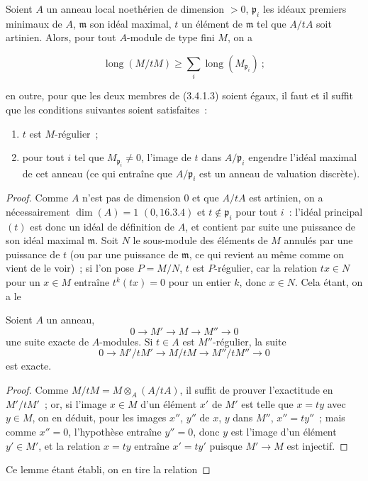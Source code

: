 \begin{lemma}[3.4.1.2]
\label{IV.2.3.4.1.2-fr}
Soient $A$ un anneau local noethérien de dimension $>0$, $\mathfrak p_i$ les
idéaux premiers minimaux de $A$, $\mathfrak m$ son idéal maximal, $t$ un
élément de $\mathfrak m$ tel que $A/tA$ soit artinien. Alors, pour tout
$A$-module de type fini $M$, on a
\end{lemma}

\begin{env}[3.4.1.3]
\label{IV.2.3.4.1.3-fr}
\[
\operatorname{long}(M/tM)
\geqslant\sum_i\operatorname{long}(M_{\mathfrak p_i})~;
\]
\end{env}

en outre, pour que les deux membres de (3.4.1.3) soient égaux, il faut et il
suffit que les conditions suivantes soient satisfaites~:


\begin{enumerate}
\item[$\alpha$)] $t$ est $M$-régulier~;
\item[$\beta$)] pour tout $i$ tel que $M_{\mathfrak p_i}\neq0$, l'image de $t$
dans $A/\mathfrak p_i$ engendre l'idéal maximal de cet anneau (ce qui entraîne
que $A/\mathfrak p_i$ est un anneau de valuation discrète).
\end{enumerate}

\begin{proof}
Comme $A$ n'est pas de dimension $0$ et que $A/tA$ est artinien, on a
nécessairement $\dim(A)=1$ $(0,16.3.4)$ et $t\notin\mathfrak p_i$ pour tout
$i$~: l'idéal principal $(t)$ est donc un idéal de définition de $A$, et
contient par suite une puissance de son idéal maximal $\mathfrak m$. Soit $N$
le sous-module des éléments de $M$ annulés par une puissance de $t$ (ou par
une puissance de $\mathfrak m$, ce qui revient au même comme on vient de le
voir)~; si l'on pose $P=M/N$, $t$ est $P$-régulier, car la relation $tx\in N$
pour un $x\in M$ entraîne $t^k(tx)=0$ pour un entier $k$, donc $x\in N$. Cela
étant, on a le

\begin{lemma}[3.4.1.4]
\label{IV.2.3.4.1.4-fr}
Soient $A$ un anneau,
\[
0\longrightarrow M'\longrightarrow M\longrightarrow M''\longrightarrow0
\]
une suite exacte de $A$-modules. Si $t\in A$ est $M''$-régulier, la suite
\[
0\longrightarrow M'/tM'\longrightarrow M/tM
\longrightarrow M''/tM''\longrightarrow0
\]
est exacte.
\end{lemma}

\begin{proof}
Comme $M/tM=M\otimes_A(A/tA)$, il suffit de prouver l'exactitude en $M'/tM'$~;
or, si l'image $x\in M$ d'un élément $x'$ de $M'$ est telle que $x=ty$ avec
$y\in M$, on en déduit, pour les images $x''$, $y''$ de $x$, $y$ dans $M''$,
$x''=ty''$~; mais comme $x''=0$, l'hypothèse entraîne $y''=0$, donc $y$ est
l'image d'un élément $y'\in M'$, et la relation $x=ty$ entraîne $x'=ty'$
puisque $M'\to M$ est injectif.
\end{proof}

Ce lemme étant établi, on en tire la relation
\end{proof}

